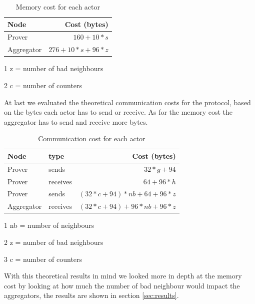 \documentclass[10pt, a4paper, twocolumn]{article} %
\begin{document}
\begin{table}
	\caption{Memory cost for each actor}
	\centering
	\begin{threeparttable}
	\begin{tabular}{lr}
		\toprule
		Node & Cost (bytes) \\
		\midrule
		Prover & $160+10*s $ \\
		Aggregator & $276+10*s+96*z $ \\
		\bottomrule
	\end{tabular}
	\begin{tablenotes}
		\item[1] z = number of bad neighbours
		\item[2] c = number of counters
		\end{tablenotes} 
	\end{threeparttable}
\end{table}
At last we evaluated the theoretical communication costs for the protocol, based on the bytes each actor has to send or receive.
As for the memory cost the aggregator has to send and receive more bytes.
\begin{table}
	\caption{Communication cost for each actor}
	\centering
	\begin{threeparttable}
	\begin{tabular}{llr}
		\toprule
		Node & type & Cost (bytes) \\
		\midrule
		Prover & sends & $32*g + 94 $ \\
		Prover & receives & $64 + 96 * h $ \\
		Prover & sends & $ (32*c+94)*nb + 64 + 96*z$ \\
		Aggregator & receives & $(32*c+94) + 96* nb + 96*z $ \\
		\bottomrule
	\end{tabular}
	\begin{tablenotes}
		\item[1] nb = number of neighbours
		\item[2] z = number of bad neighbours
		\item[3] c = number of counters  
		\end{tablenotes} 
	\end{threeparttable}
\end{table}

With this theoretical results in mind we looked more in depth at the memory cost by looking at how much the number of bad neighbour would impact the aggregators, the results are shown in section \ref{sec:results}.
\end{document}
